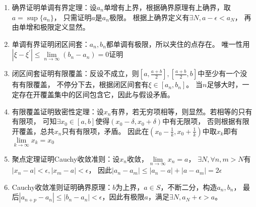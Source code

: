 \begin{enumerate}
\item 确界证明单调有界定理：设$a_n$单增有上界，根据确界原理有上确界，取$a = \sup \{a_n\}$，
  只需证明$a$是$a_n$极限。
  根据上确界定义有$\exists N, a- \epsilon < a_N$，
  再由单增和极限定义显然。
\item 单调有界证明闭区间套：$a_n,b_n$都单调有极限，所以夹住的点存在。
  唯一性用$|\xi - \xi^{\prime}| \leq \lim \limits _{n \rightarrow \infty} (b_n - a_n) = 0$证明
\item 闭区间套证明有限覆盖：反设不成立，则$[a,\frac{a+b}{2}],[\frac{a+b}{2},b]$中至少有一个没有有限覆盖，
  不停分下去，根据闭区间套有$\xi \in [a_n,b_n]$。
  当$n$足够大时，一定存在开覆盖集中的区间包含它，因此与假设矛盾。
\item 有限覆盖证明致密性定理：设$x_n$有界，若无穷项相等，则显然。若相等的只有有限项，
  可知$\exists x_0 \in [a,b]$使得$(x_0 - \delta, x_0 + \delta)$中有无限项，
  否则根据有限开覆盖，总共$x_n$只有有限项，矛盾。
  因此在$(x_0 - \frac{1}{k},x_0 + \frac{1}{k})$中取$x_k$即有$\lim \limits _{k \rightarrow \infty}x_k = x_0$
\item 聚点定理证明Cauchy收敛准则：设$x_n$收敛，$\lim \limits _{n \rightarrow \infty} x_n = a$，
  $\exists N, \forall n,m > N$有$|x_n - a| < \epsilon, |x_m - a| < \epsilon$，
  因此$|a_n - a_m| \leq |a_n - a| + |a - a_m| = 2\epsilon$
\item Cauchy收敛准则证明确界原理：$b$为上界，$a \in S$，不断二分，构造$a_n,b_n$，
  最后$|a_{n+p} - a_n| \leq |b_n - a_n| < \epsilon$，因此有极限$a$，满足$\exists N, a_N + \epsilon > a$。
\end{enumerate}













